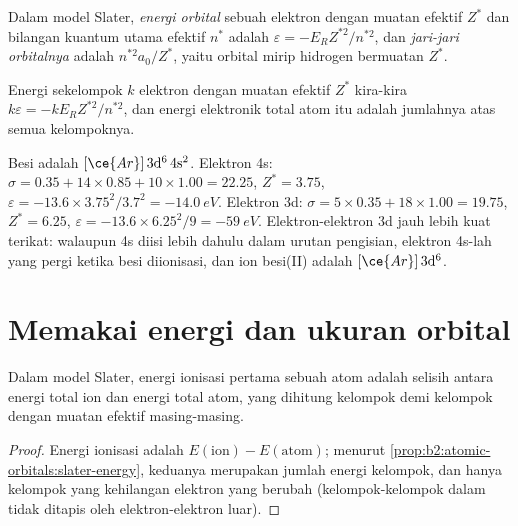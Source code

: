 \begin{definition}\label{def:b2:atomic-orbitals:orbital-energy}
Dalam model Slater, \emph{energi orbital} sebuah
elektron dengan muatan efektif $Z^*$ dan bilangan kuantum utama efektif
$n^*$ adalah $\varepsilon = -E_RZ^{*2}/n^{*2}$, dan \emph{jari-jari
orbitalnya} adalah $n^{*2}a_0/Z^*$, yaitu
 orbital mirip hidrogen bermuatan $Z^*$.
\end{definition}

\begin{proposition}\label{prop:b2:atomic-orbitals:slater-energy}
Energi sekelompok $k$ elektron dengan muatan efektif $Z^*$ kira-kira
$k\varepsilon = -kE_RZ^{*2}/n^{*2}$, dan energi elektronik total atom itu
adalah jumlahnya atas semua kelompoknya.
\end{proposition}

\admitted

\begin{example}\label{ex:b2:atomic-orbitals:iron}
Besi adalah $[\ce{Ar}]\,3\mathrm d^6\,4\mathrm s^2$. Elektron 4s: $\sigma = 0.35 + 14
\times 0.85 + 10 \times 1.00 = 22.25$, $Z^* = 3.75$, $\varepsilon = -13.6 \times
3.75^2/3.7^2 = \qty{-14.0}{eV}$. Elektron 3d: $\sigma = 5 \times 0.35 + 18 \times 1.00 =
19.75$, $Z^* = 6.25$, $\varepsilon = -13.6 \times 6.25^2/9 = \qty{-59}{eV}$.
Elektron-elektron 3d jauh lebih kuat terikat: walaupun 4s diisi lebih
dahulu dalam urutan pengisian, elektron 4s-lah yang pergi ketika besi
diionisasi, dan ion besi(II) adalah $[\ce{Ar}]\,3\mathrm d^6$.
\end{example}

\section{Memakai energi dan ukuran orbital}

\begin{proposition}\label{prop:b2:atomic-orbitals:ionisation}
Dalam model Slater, energi ionisasi pertama sebuah atom adalah selisih
antara energi total ion dan energi total atom, yang dihitung kelompok demi
kelompok dengan muatan efektif masing-masing.
\end{proposition}

\begin{proof}
Energi ionisasi adalah $E(\text{ion}) - E(\text{atom})$; menurut
\cref{prop:b2:atomic-orbitals:slater-energy}, keduanya merupakan jumlah
energi kelompok, dan hanya kelompok yang kehilangan elektron yang berubah
(kelompok-kelompok dalam tidak ditapis oleh elektron-elektron luar).
\end{proof}

